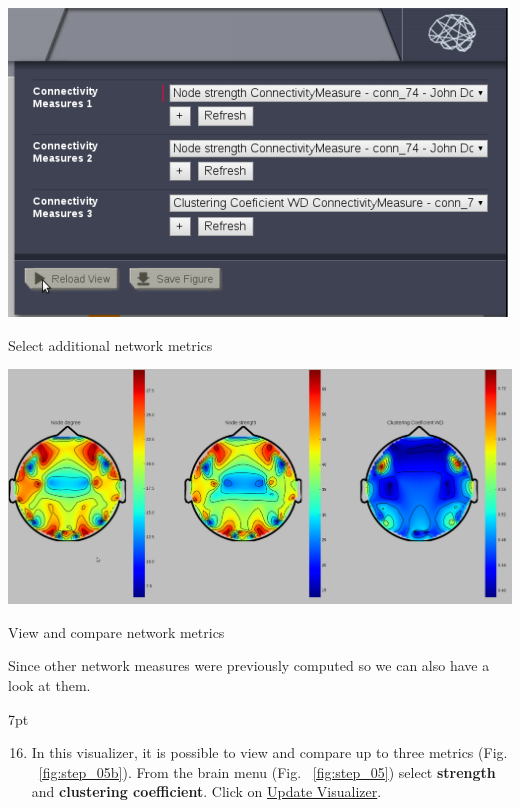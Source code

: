 \documentclass{tufte-handout}
\newenvironment{formal}{%
  \def\FrameCommand{%
    \hspace{1pt}%
    {\color{DarkBlue}\vrule width 2pt}%
    {\color{formalshade}\vrule width 4pt}%
    \colorbox{formalshade}%
  }%
  \MakeFramed{\advance\hsize-\width\FrameRestore}%
  \noindent\hspace{-4.55pt}%
  \begin{adjustwidth}{}{7pt}%
  \vspace{2pt}\vspace{2pt}%
}
{%
  \vspace{2pt}\end{adjustwidth}\endMakeFramed%
}
\begin{document}
\newpage
\begin{marginfigure}
  \includegraphics[width=\linewidth]{Handout_UI_ModellingStructuralLesions_AnalysisView}%
  \caption{Select additional network metrics}%
  \label{fig:step_05}%
\end{marginfigure}

\begin{marginfigure}
  \includegraphics[width=\linewidth]{Handout_UI_ModellingStructuralLesions_AnalysisResultCompare}%
  \caption{View and compare network metrics}%
  \label{fig:step_05b}%
\end{marginfigure}
\noindent Since other network measures were previously computed so we can also have a look at them. 
\begin{formal}
  \begin{enumerate}[resume] %
  \setcounter{enumi}{15}
  \item In this visualizer, it is possible to view and compare up to three metrics (Fig. ~\ref{fig:step_05b}). From the brain menu (Fig. ~\ref{fig:step_05}) select \textbf{strength} and \textbf{clustering coefficient}. Click on \underline{Update Visualizer}.
  \end{enumerate}
\end{formal}
\end{document}
